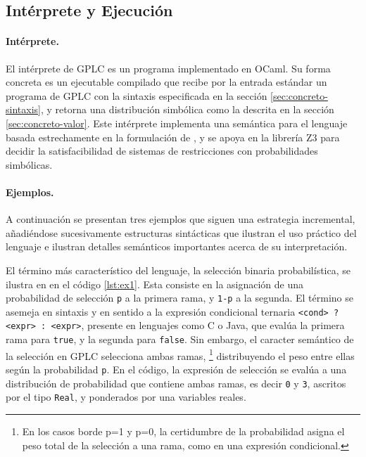 \subsection{Intérprete y Ejecución}

\paragraph{Intérprete.} El intérprete de GPLC es un programa
implementado en OCaml. Su forma concreta es un ejecutable
compilado que recibe por la entrada estándar un programa de GPLC con
la sintaxis especificada en la sección \ref{sec:concreto-sintaxis}, y
retorna una distribución simbólica como la descrita en la sección
\ref{sec:concreto-valor}. Este intérprete implementa una semántica
para el lenguaje basada estrechamente en la formulación de \cite{gplc}, y se
apoya en la librería Z3 para decidir la satisfacibilidad de sistemas de
restricciones con probabilidades simbólicas.


\paragraph{Ejemplos.} A continuación se presentan tres ejemplos que
siguen una estrategia incremental, añadiéndose
sucesivamente estructuras sintácticas que ilustran el
uso práctico del lenguaje e ilustran detalles semánticos
importantes acerca de su interpretación.

El término más característico del lenguaje, la selección binaria
probabilística, se ilustra en en el código \ref{lst:ex1}. Esta
consiste en la asignación de una probabilidad de selección
\lstinline|p| a la primera rama, y \lstinline|1-p| a la segunda. El
término se asemeja en sintaxis y en sentido a la expresión condicional
ternaria \verb|<cond> ? <expr> : <expr>|, presente en lenguajes como C
o Java, que evalúa la primera rama para \verb|true|, y la segunda para
\verb|false|. Sin embargo, el caracter semántico de la selección en
GPLC selecciona ambas ramas, \footnote{En los casos borde p=1 y p=0,
  la certidumbre de la probabilidad asigna el peso total de la
  selección a una rama, como en una expresión condicional.}
distribuyendo el peso entre ellas según la probabilidad \verb|p|.  En
el código, la expresión de selección se evalúa a una distribución de
probabilidad que contiene ambas ramas, es decir \lstinline|0| y
\lstinline|3|, ascritos por el tipo \lstinline|Real|, y ponderados por
una variables reales.




